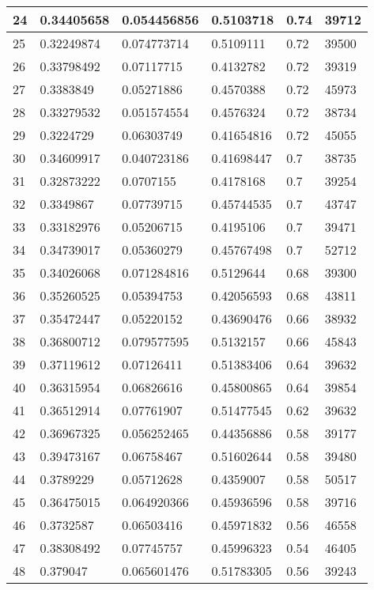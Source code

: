 \begin{longtable}{|l|l|l|l|l|l|}
24 & 0.34405658 & 0.054456856 & 0.5103718 & 0.74 & 39712 \\ \hline 
25 & 0.32249874 & 0.074773714 & 0.5109111 & 0.72 & 39500 \\ \hline 
26 & 0.33798492 & 0.07117715 & 0.4132782 & 0.72 & 39319 \\ \hline 
27 & 0.3383849 & 0.05271886 & 0.4570388 & 0.72 & 45973 \\ \hline 
28 & 0.33279532 & 0.051574554 & 0.4576324 & 0.72 & 38734 \\ \hline 
29 & 0.3224729 & 0.06303749 & 0.41654816 & 0.72 & 45055 \\ \hline 
30 & 0.34609917 & 0.040723186 & 0.41698447 & 0.7 & 38735 \\ \hline 
31 & 0.32873222 & 0.0707155 & 0.4178168 & 0.7 & 39254 \\ \hline 
32 & 0.3349867 & 0.07739715 & 0.45744535 & 0.7 & 43747 \\ \hline 
33 & 0.33182976 & 0.05206715 & 0.4195106 & 0.7 & 39471 \\ \hline 
34 & 0.34739017 & 0.05360279 & 0.45767498 & 0.7 & 52712 \\ \hline 
35 & 0.34026068 & 0.071284816 & 0.5129644 & 0.68 & 39300 \\ \hline 
36 & 0.35260525 & 0.05394753 & 0.42056593 & 0.68 & 43811 \\ \hline 
37 & 0.35472447 & 0.05220152 & 0.43690476 & 0.66 & 38932 \\ \hline 
38 & 0.36800712 & 0.079577595 & 0.5132157 & 0.66 & 45843 \\ \hline 
39 & 0.37119612 & 0.07126411 & 0.51383406 & 0.64 & 39632 \\ \hline 
40 & 0.36315954 & 0.06826616 & 0.45800865 & 0.64 & 39854 \\ \hline 
41 & 0.36512914 & 0.07761907 & 0.51477545 & 0.62 & 39632 \\ \hline 
42 & 0.36967325 & 0.056252465 & 0.44356886 & 0.58 & 39177 \\ \hline 
43 & 0.39473167 & 0.06758467 & 0.51602644 & 0.58 & 39480 \\ \hline 
44 & 0.3789229 & 0.05712628 & 0.4359007 & 0.58 & 50517 \\ \hline 
45 & 0.36475015 & 0.064920366 & 0.45936596 & 0.58 & 39716 \\ \hline 
46 & 0.3732587 & 0.06503416 & 0.45971832 & 0.56 & 46558 \\ \hline 
47 & 0.38308492 & 0.07745757 & 0.45996323 & 0.54 & 46405 \\ \hline 
48 & 0.379047 & 0.065601476 & 0.51783305 & 0.56 & 39243 \\ \hline 

\end{longtable}
